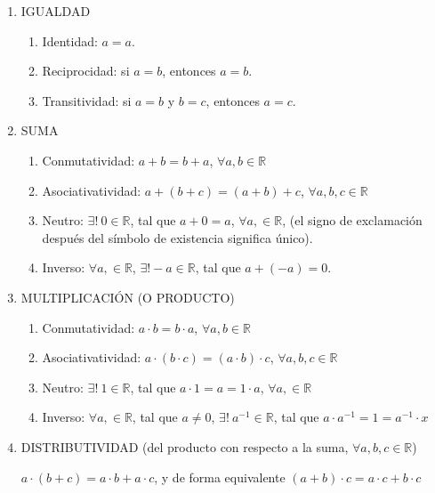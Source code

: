 \documentclass[12pt,letterpaper]{article}
\theoremstyle{definition}
\begin{document}
\begin{enumerate}[label=\Alph*.] 

	\item IGUALDAD
    \begin{enumerate}[label={\arabic*.}]
    	\item Identidad: $a=a$.
        \item Reciprocidad: si $a=b$, entonces $a=b$.
        \item Transitividad: si $a=b$ y $b=c$, entonces $a=c$.
    \end{enumerate}
    
	\item SUMA    
    \begin{enumerate}[label={\arabic*.}]
        \item Conmutatividad: $a+b=b+a$, $\forall a,b\in\mathbb{R}$
        \item Asociativatividad: $a+(b+c)=(a+b)+c$, $\forall a,b,c\in\mathbb{R}$
        \item Neutro: $\exists !\ 0 \in \mathbb{R}$, tal que $a+0=a$, $\forall a,\in\mathbb{R}$, \quad (el signo de exclamación después del símbolo de existencia significa único).
    	\item Inverso: $\forall a,\in\mathbb{R}$, $\exists ! -a \in \mathbb{R}$, tal que $a+(-a)=0$.
    \end{enumerate}
    
    \item MULTIPLICACIÓN (O PRODUCTO)
    \begin{enumerate}[label={\arabic*.}]
        \item Conmutatividad: $a\cdot b=b\cdot a$, $\forall a,b\in\mathbb{R}$
        \item Asociativatividad: $a\cdot(b\cdot c)=(a\cdot b)\cdot c$, $\forall a,b,c\in\mathbb{R}$
        \item Neutro: $\exists !\ 1 \in \mathbb{R}$, tal que $a\cdot 1=a=1\cdot a$, $\forall a,\in\mathbb{R}$
    	\item Inverso: $\forall a,\in\mathbb{R}$, tal que $a\neq 0$, $\exists !\ a^{-1} \in \mathbb{R}$, tal que $a\cdot a^{-1}=1=a^{-1}\cdot x$ \label{ax:invmult}
	\end{enumerate}
    
	\item DISTRIBUTIVIDAD (del producto con respecto a la suma, $\forall a,b,c\in\mathbb{R}$) \
    
        $a\cdot (b+c)=a\cdot b+a\cdot c$, y de forma equivalente $(a+b)\cdot c=a\cdot c+b\cdot c$
        

\end{enumerate}
\end{document}
